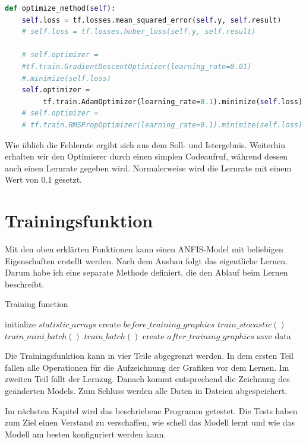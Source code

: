 \begin{lstlisting}[language=Python]
def optimize_method(self):
	self.loss = tf.losses.mean_squared_error(self.y, self.result)
	# self.loss = tf.losses.huber_loss(self.y, self.result)
	
	# self.optimizer =  
	#tf.train.GradientDescentOptimizer(learning_rate=0.01)
	#.minimize(self.loss)
	self.optimizer =
		 tf.train.AdamOptimizer(learning_rate=0.1).minimize(self.loss)
	# self.optimizer =
	# tf.train.RMSPropOptimizer(learning_rate=0.1).minimize(self.loss)
\end{lstlisting}
 
Wie üblich die Fehlerate ergibt sich aus dem Soll- und Istergebnis.
Weiterhin erhalten wir den Optimierer durch einen simplen Codeaufruf,
während dessen auch einen Lernrate gegeben wird. Normalerweise wird die
Lernrate mit einem Wert von 0.1 gesetzt.


\section{Trainingsfunktion}\label{trainingsfunktion}

Mit den oben erklärten Funktionen kann einen ANFIS-Model mit beliebigen
Eigenschaften erstellt werden. Nach dem Ausbau folgt das eigentliche
Lernen. Darum habe ich eine separate Methode definiert, die den Ablauf
beim Lernen beschreibt.
%	

\begin{algorithm}
	\caption{Training function}
	\begin{algorithmic}[1]
		\REQUIRE initialize $statistic\_arrays$
		\STATE create $before\_training\_graphics$
			\STATE $train\_stocastic()$
			\STATE $train\_mini\_batch()$
		\ELSE
			\STATE $train\_batch()$
		\ENDIF
		\STATE create $after\_training\_graphics$
		\STATE save data
	\end{algorithmic}
\end{algorithm}

Die Trainingsfunktion kann in vier Teile abgegrenzt werden. In dem ersten Teil fallen alle Operationen für die Aufzeichnung der Grafiken vor dem Lernen. Im zweiten Teil fällt der Lernzug. Danach kommt entsprechend die Zeichnung des 
geänderten Models. Zum Schluss werden alle Daten in Dateien abgespeichert.

Im nächsten Kapitel wird das beschriebene Programm getestet. Die Tests haben zum Ziel einen Verstand zu verschaffen, wie schell das Modell lernt und wie das Modell am besten konfiguriert werden kann.